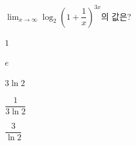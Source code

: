 $\displaystyle\lim_{x\to\infty}\log_2\left(1+\dfrac{1}{x}\right)^{3x}$의 값은?
\begin{choices32}{\rule[-3ex]{0pt}{8ex}$1$}{\rule[-3ex]{0pt}{8ex}$e$}{\rule[-3ex]{0pt}{8ex}$3\ln 2$}{\rule[-3ex]{0pt}{8ex}$\dfrac{1}{3\ln 2}$}{\rule[-3ex]{0pt}{8ex}$\dfrac{3}{\ln 2}$}\end{choices32}
